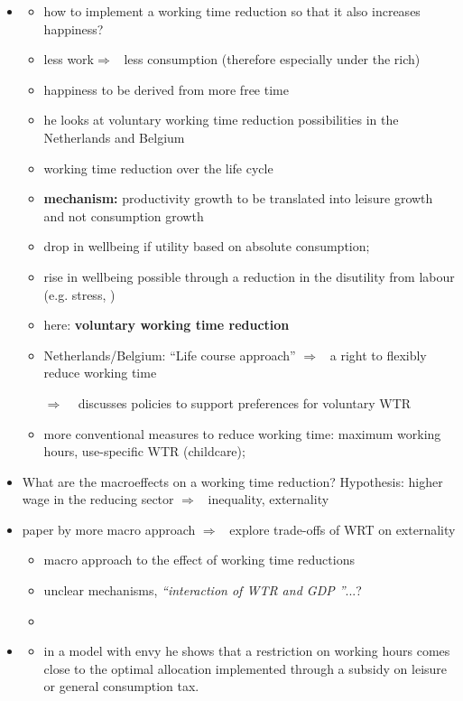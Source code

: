 \documentclass[12pt]{article}
\newcommand{\ar}{$\Rightarrow$ \ }
\begin{document}
\begin{itemize}
\item \cite{Pullinger2014WorkingDesign}
\begin{itemize}
\item how to implement a working time reduction so that it also increases happiness?
\item less work\ar less consumption (therefore especially under the rich)
\item happiness to be derived from more free time
\item he looks at voluntary working time reduction possibilities in the Netherlands and Belgium
\item working time reduction over the life cycle
\item \textbf{mechanism:} productivity growth to be translated into leisure growth and not consumption growth
\item drop in wellbeing if utility based on absolute consumption; 
\item rise in wellbeing possible through a reduction in the disutility from labour (e.g. stress, )
\item here: \textbf{voluntary working time reduction}
\item Netherlands/Belgium: ``Life course approach'' \ar a right to flexibly reduce working time
\item[\ar] discusses policies to support preferences for voluntary WTR
\item more conventional measures to reduce working time: 
maximum working hours, use-specific WTR (childcare); 
\end{itemize}
\item What are the macroeffects on a working time reduction? Hypothesis: higher wage in the reducing sector \ar inequality, externality
\item paper by \cite{Cieplinski2021EnvironmentalReductionb} more macro approach \ar explore trade-offs of WRT on externality
\begin{itemize}
\item macro approach to the effect of working time reductions
\item unclear mechanisms, \textit{``interaction of WTR and GDP ''}...?
\item 
\end{itemize}
\item \cite{Alvarez-Cuadrado2007EnvyHours}
\begin{itemize}
\item in a model with envy he shows that a restriction on working hours comes close to the optimal allocation implemented through a subsidy on leisure or general consumption tax.

\end{itemize}
\end{itemize}
\end{document}
